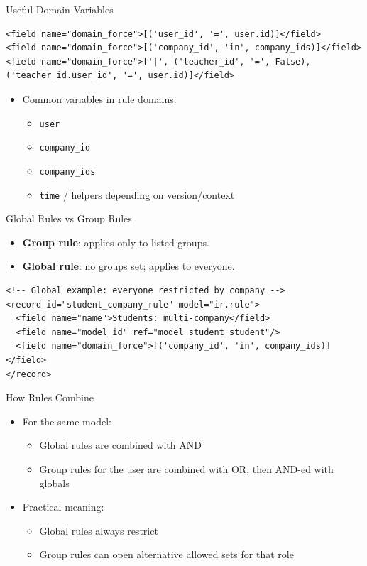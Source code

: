 \begin{frame}[fragile]{Useful Domain Variables}
\begin{lstlisting}[style=xml]
<field name="domain_force">[('user_id', '=', user.id)]</field>
<field name="domain_force">[('company_id', 'in', company_ids)]</field>
<field name="domain_force">['|', ('teacher_id', '=', False), ('teacher_id.user_id', '=', user.id)]</field>
\end{lstlisting}
	\begin{itemize}
		\item Common variables in rule domains:
		\begin{itemize}
			\item \texttt{user}
			\item \texttt{company\_id}
			\item \texttt{company\_ids}
			\item \texttt{time} / helpers depending on version/context
		\end{itemize}
	\end{itemize}
\end{frame}

\begin{frame}[fragile]{Global Rules vs Group Rules}
	\begin{itemize}
		\item \textbf{Group rule}: applies only to listed groups.
		\item \textbf{Global rule}: no groups set; applies to everyone.
	\end{itemize}
\begin{lstlisting}[style=xml]
<!-- Global example: everyone restricted by company -->
<record id="student_company_rule" model="ir.rule">
  <field name="name">Students: multi-company</field>
  <field name="model_id" ref="model_student_student"/>
  <field name="domain_force">[('company_id', 'in', company_ids)]</field>
</record>
\end{lstlisting}
\end{frame}

\begin{frame}[fragile]{How Rules Combine}
	\begin{itemize}
		\item For the same model:
		\begin{itemize}
			\item Global rules are combined with AND
			\item Group rules for the user are combined with OR, then AND-ed with globals
		\end{itemize}
		\item Practical meaning:
		\begin{itemize}
			\item Global rules always restrict
			\item Group rules can open alternative allowed sets for that role
		\end{itemize}
	\end{itemize}
\end{frame}

